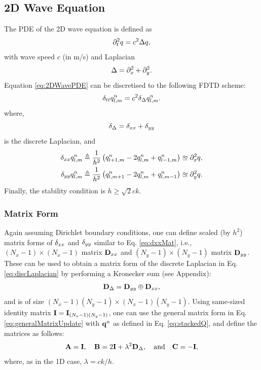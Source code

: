 \documentclass[fleqn]{jaes}
\begin{document}
\subsection{2D Wave Equation}
The PDE of the 2D wave equation is defined as
\begin{equation}\label{eq:2DWavePDE}
    \ptt q = c^2 \Delta q,
\end{equation}
with wave speed $c$ (in m/s) and Laplacian
\begin{equation}
    \Delta = \partial_x^2 + \partial_y^2.
\end{equation}
Equation \eqref{eq:2DWavePDE} can be discretised to the following FDTD scheme:
\begin{equation}\label{eq:2DWaveFDS}
    \dtt \qlmn = c^2 \dDelta \qlmn.
\end{equation}
where,
\begin{equation}\label{eq:discLaplacian}
    \dDelta = \dxx + \dyy
\end{equation}
is the discrete Laplacian, and 
\begin{subequations}
\begin{align}
    \delta_{xx} q_{l,m}^n &\triangleq \frac{1}{h^2}\left(q_{l+1,m}^n - 2 q_{l,m}^n + q_{l-1,m}^n\right)\approxeq \partial_x^2 q,\\
    \delta_{yy} q_{l,m}^n &\triangleq \frac{1}{h^2}\left(q_{l,m+1}^n - 2 q_{l,m}^n + q_{l,m-1}^n\right)\approxeq \partial_y^2 q.
\end{align}
\end{subequations}
Finally, the stability condition is $h \geq \sqrt{2}c k$.

\subsubsection{Matrix Form}
Again assuming Dirichlet boundary conditions, one can define scaled (by $h^2$) matrix forms of $\delta_{xx}$ and $\delta_{yy}$ similar to Eq. \eqref{eq:dxxMat}, i.e., $(N_x-1)\times(N_x-1)$ matrix $\mathbf{D}_{xx}$ and $(N_y-1)\times(N_y-1)$ matrix $\mathbf{D}_{yy}$. These can be used to obtain a matrix form of the discrete Laplacian in Eq. \eqref{eq:discLaplacian} by performing a Kronecker sum \cite{Horn1991} (see Appendix):
\begin{equation}\label{eq:kroneckerSum}
    \DDeltamat = \Dyy \oplus \Dxx,
\end{equation}
and is of size $(N_x-1)(N_y-1)\times (N_x-1)(N_y-1)$.
%
Using same-sized identity matrix $\mathbf{I} = \mathbf{I}_{(N_x-1)(N_y-1)}$, one can use the general matrix form in Eq. \eqref{eq:generalMatrixUpdate} with $\mathbf{q}^n$ as defined in Eq. \eqref{eq:stackedQ}, and define the matrices as follows:
\begin{equation}
    \A = \I, \quad \B = 2\I + \lambda^2 \DDeltamat, \qaq \C = -\I,
\end{equation}
where, as in the 1D case, $\lambda = c k /h$.
\end{document}

